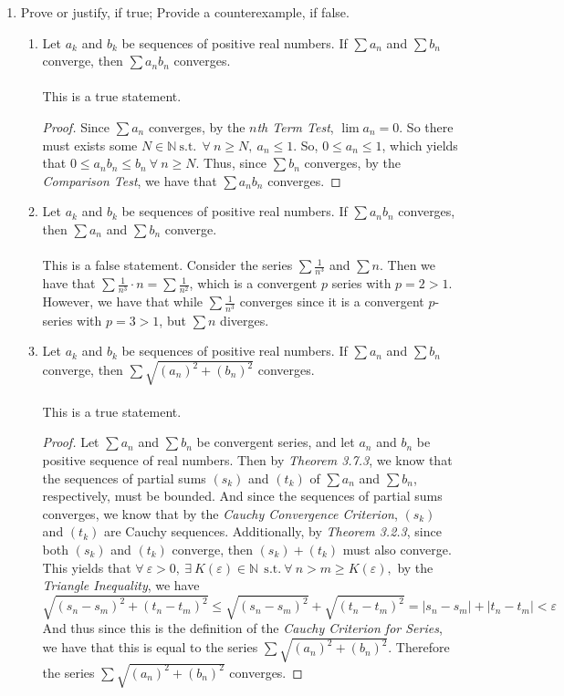 \documentclass[12pt,letterpaper]{article}
\newcommand{\st}{\ \text{s.t.}\ }
\newcommand{\N}{\mathbb{N}}
\theoremstyle{case}
\theoremstyle{definition}
\begin{document}
\begin{enumerate}
		\item Prove or justify, if true; Provide a counterexample, if false.
		\begin{enumerate}
			\item Let $a_k$ and $b_k$ be sequences of positive real numbers. If $\sum a_n$ and $\sum b_n$ converge, then $\sum a_nb_n$ converges.
			\\\\This is a true statement.
			\begin{proof}
				Since $\sum a_n$ converges, by the \textit{$n$th Term Test}, $\lim a_n = 0$. So there must exists some $N \in \N \st\ \forall\ n \geq N,\ a_n \leq 1$. So, $0 \leq a_n \leq 1$, which yields that $0 \leq a_nb_n \leq b_n\ \forall\ n \geq N$. Thus, since $\sum b_n$ converges, by the \textit{Comparison Test}, we have that $\sum a_nb_n$ converges.
			\end{proof}
			
			\item Let $a_k$ and $b_k$ be sequences of positive real numbers. If $\sum a_nb_n$ converges, then $\sum a_n$ and $\sum b_n$ converge. 
			\\\\This is a false statement. Consider the series $\sum \frac{1}{n^3}$ and $\sum n$. Then we have that $\sum \frac{1}{n^3} \cdot n = \sum \frac{1}{n^2}$, which is a convergent $p$ series with $p=2>1$. However, we have that while $\sum \frac{1}{n^3}$ converges since it is a convergent $p$-series with $p=3>1$, but $\sum n$ diverges.\\
			
			\item Let $a_k$ and $b_k$ be sequences of positive real numbers. If $\sum a_n$ and $\sum b_n$ converge, then $\sum\sqrt{(a_n)^2+(b_n)^2}$ converges.
			\\\\This is a true statement.
			\begin{proof}
				Let $\sum a_n$ and $\sum b_n$ be convergent series, and let $a_n$ and $b_n$ be positive sequence of real numbers. Then by \textit{Theorem 3.7.3}, we know that the sequences of partial sums $(s_k)$ and $(t_k)$ of $\sum a_n$ and $\sum b_n$, respectively, must be bounded. And since the sequences of partial sums converges, we know that by the  \textit{Cauchy Convergence Criterion}, $(s_k)$ and $(t_k)$ are Cauchy sequences. Additionally, by \textit{Theorem 3.2.3}, since both $(s_k)$ and $(t_k)$ converge, then $(s_k)+(t_k)$ must also converge. This yields that $\forall\ \varepsilon>0,\ \exists\ K(\varepsilon) \in \N\ \st \forall\ n>m\geq K(\varepsilon),$ by the \textit{Triangle Inequality}, we have 
				\[\sqrt{(s_n-s_m)^2+(t_n-t_m)^2} \leq \sqrt{(s_n-s_m)^2} + \sqrt{(t_n-t_m)^2} = |s_n-s_m|+|t_n-t_m| < \varepsilon\]
				And thus since this is the definition of the \textit{Cauchy Criterion for Series}, we have that this is equal to the series $\sum \sqrt{(a_n)^2+(b_n)^2}$. Therefore the series $\sum \sqrt{(a_n)^2+(b_n)^2}$ converges.
			\end{proof}
		

\end{enumerate}
\end{enumerate}
\end{document}
